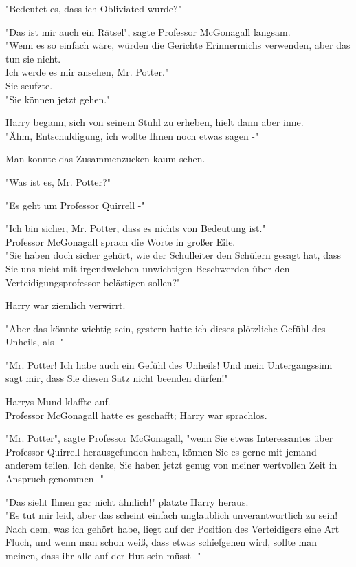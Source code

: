 {"Bedeutet es, dass ich Obliviated wurde?"

"Das ist mir auch ein Rätsel", sagte Professor McGonagall langsam.\\ "Wenn es so einfach wäre, würden die Gerichte Erinnermichs verwenden, aber das tun sie nicht.\\ Ich werde es mir ansehen, Mr. Potter."\\ Sie seufzte.\\ "Sie können jetzt gehen."

Harry begann, sich von seinem Stuhl zu erheben, hielt dann aber inne.\\ "Ähm, Entschuldigung, ich wollte Ihnen noch etwas sagen -"

Man konnte das Zusammenzucken kaum sehen.

"Was ist es, Mr. Potter?"

"Es geht um Professor Quirrell -"

"Ich bin sicher, Mr. Potter, dass es nichts von Bedeutung ist."\\ Professor McGonagall sprach die Worte in großer Eile.\\ "Sie haben doch sicher gehört, wie der Schulleiter den Schülern gesagt hat, dass Sie uns nicht mit irgendwelchen unwichtigen Beschwerden über den Verteidigungsprofessor belästigen sollen?"

Harry war ziemlich verwirrt.

"Aber das könnte wichtig sein, gestern hatte ich dieses plötzliche Gefühl des Unheils, als -"

"Mr. Potter! Ich habe auch ein Gefühl des Unheils! Und mein Untergangssinn sagt mir, dass Sie diesen Satz nicht beenden dürfen!"

Harrys Mund klaffte auf.\\ Professor McGonagall hatte es geschafft; Harry war sprachlos.

"Mr. Potter", sagte Professor McGonagall, "wenn Sie etwas Interessantes über Professor Quirrell herausgefunden haben, können Sie es gerne mit jemand anderem teilen. Ich denke, Sie haben jetzt genug von meiner wertvollen Zeit in Anspruch genommen -"

"Das sieht Ihnen gar nicht ähnlich!" platzte Harry heraus.\\ "Es tut mir leid, aber das scheint einfach unglaublich unverantwortlich zu sein!\\ Nach dem, was ich gehört habe, liegt auf der Position des Verteidigers eine Art Fluch, und wenn man schon weiß, dass etwas schiefgehen wird, sollte man meinen, dass ihr alle auf der Hut sein müsst -"

}
